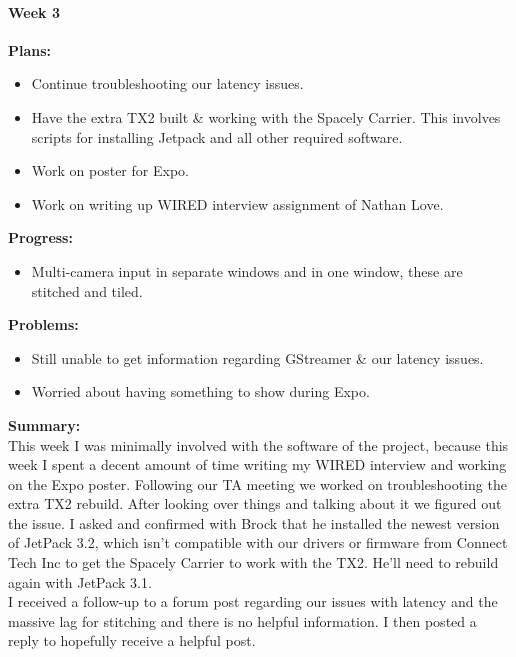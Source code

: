 \paragraph{Week 3}
\begin{adjustwidth}{2.5em}{0pt}
    \vspace{-0.5cm}\textbf{Plans:}
    \vspace{-0.5cm}
    \begin{itemize}
        \item Continue troubleshooting our latency issues.
		\item Have the extra TX2 built \& working with the Spacely Carrier. This involves scripts for installing Jetpack and all other required software. 
		\item Work on poster for Expo.
		\item Work on writing up WIRED interview assignment of Nathan Love. 
    \end{itemize} 
    \vspace{-0.3cm}\textbf{Progress:}
    \vspace{-0.5cm}
    \begin{itemize}
        \item Multi-camera input in separate windows and in one window, these are stitched and tiled.  
    \end{itemize} 
    \vspace{-0.3cm}\textbf{Problems:}
    \vspace{-0.5cm}
    \begin{itemize}
        \item Still unable to get information regarding GStreamer \& our latency issues. 
		\item Worried about having something to show during Expo. 
    \end{itemize}  
    \vspace{-0.3cm}\noindent\textbf{Summary:}\\
    \noindent This week I was minimally involved with the software of the project, because this week I spent a decent amount of time writing my WIRED interview and working on the Expo poster. Following our TA meeting we worked on troubleshooting the extra TX2 rebuild. After looking over things and talking about it we figured out the issue. I asked and confirmed with Brock that he installed the newest version of JetPack 3.2, which isn't compatible with our drivers or firmware from Connect Tech Inc to get the Spacely Carrier to work with the TX2. He'll need to rebuild again with JetPack 3.1. \\
			  I received a follow-up to a forum post regarding our issues with latency and the massive lag for stitching and there is no helpful information. I then posted a reply to hopefully receive a helpful post. \\
\end{adjustwidth} 

